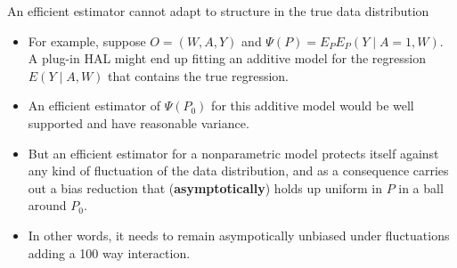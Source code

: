 \documentclass[t]{beamer}
\newlength{\wideitemsep}
\let\olditem\item
\renewcommand{\item}{\setlength{\itemsep}{\wideitemsep}\olditem}
\begin{document}
\begin{frame}{An efficient estimator cannot adapt to structure in the true data distribution}
\begin{itemize}
\item For example, suppose $O=(W,A,Y)$ and $\Psi(P)=E_PE_P(Y\mid A=1,W)$. A plug-in HAL might end up fitting an additive model for the regression $E(Y\mid A,W)$ that contains the true regression.
\item An efficient estimator of $\Psi(P_0)$ for this additive model would be well supported and have reasonable variance.
\item But an efficient estimator for a nonparametric model protects itself against any kind of fluctuation of the data distribution, and as a consequence carries out a bias reduction that ({\bf asymptotically}) holds up uniform in $P$ in a ball around $P_0$.
\item In other words, it needs to remain asympotically unbiased under fluctuations adding a 100 way interaction.
\end{itemize}
\end{frame}
\end{document}
